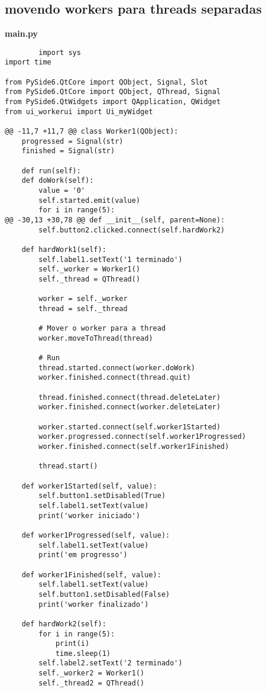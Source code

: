 \documentclass[12pt,a4paper]{article}
\begin{document}
    \subsection{movendo workers para threads separadas}
    \textbf{main.py}
    \begin{lstlisting}
        import sys
import time

from PySide6.QtCore import QObject, Signal, Slot
from PySide6.QtCore import QObject, QThread, Signal
from PySide6.QtWidgets import QApplication, QWidget
from ui_workerui import Ui_myWidget

@@ -11,7 +11,7 @@ class Worker1(QObject):
    progressed = Signal(str)
    finished = Signal(str)

    def run(self):
    def doWork(self):
        value = '0'
        self.started.emit(value)
        for i in range(5):
@@ -30,13 +30,78 @@ def __init__(self, parent=None):
        self.button2.clicked.connect(self.hardWork2)

    def hardWork1(self):
        self.label1.setText('1 terminado')
        self._worker = Worker1()
        self._thread = QThread()

        worker = self._worker
        thread = self._thread

        # Mover o worker para a thread
        worker.moveToThread(thread)

        # Run
        thread.started.connect(worker.doWork)
        worker.finished.connect(thread.quit)

        thread.finished.connect(thread.deleteLater)
        worker.finished.connect(worker.deleteLater)

        worker.started.connect(self.worker1Started)
        worker.progressed.connect(self.worker1Progressed)
        worker.finished.connect(self.worker1Finished)

        thread.start()

    def worker1Started(self, value):
        self.button1.setDisabled(True)
        self.label1.setText(value)
        print('worker iniciado')

    def worker1Progressed(self, value):
        self.label1.setText(value)
        print('em progresso')

    def worker1Finished(self, value):
        self.label1.setText(value)
        self.button1.setDisabled(False)
        print('worker finalizado')

    def hardWork2(self):
        for i in range(5):
            print(i)
            time.sleep(1)
        self.label2.setText('2 terminado')
        self._worker2 = Worker1()
        self._thread2 = QThread()


\end{lstlisting}
\end{document}
